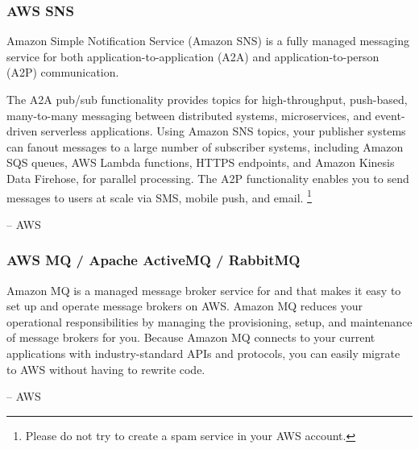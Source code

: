 \documentclass{csse4400}
\begin{document}
\subsubsection{AWS SNS}
\begin{oldquote}
Amazon Simple Notification Service (Amazon SNS) is a fully managed messaging service for both application-to-application (A2A) and application-to-person (A2P) communication.

The A2A pub/sub functionality provides topics for high-throughput,
push-based, many-to-many messaging between distributed systems,
microservices, and event-driven serverless applications.
Using Amazon SNS topics,
your publisher systems can fanout messages to a large number of subscriber systems,
including Amazon SQS queues, AWS Lambda functions,
HTTPS endpoints, and Amazon Kinesis Data Firehose,
for parallel processing.
The A2P functionality enables you to send messages to users at scale via SMS, mobile push, and email.%
\footnote{Please do not try to create a spam service in your AWS account.}

\raggedleft -- AWS
\end{oldquote}

\subsubsection{AWS MQ / Apache ActiveMQ / RabbitMQ}
\begin{oldquote}
Amazon MQ is a managed message broker service for  and
 that makes it easy to set up and operate message brokers on AWS.
Amazon MQ reduces your operational responsibilities by managing the provisioning, setup, and maintenance of message brokers for you.
Because Amazon MQ connects to your current applications with industry-standard APIs and protocols,
you can easily migrate to AWS without having to rewrite code.

\raggedleft -- AWS
\end{oldquote}

\end{document}
